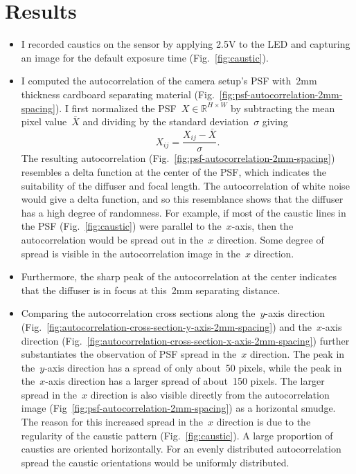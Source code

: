 \documentclass[final]{cvpr}
\begin{document}
\section{Results}

\begin{itemize}
	\item I recorded caustics on the sensor by applying 2.5V to the LED and capturing an image for the default exposure time (Fig.~\ref{fig:caustic}).

	\item I computed the autocorrelation of the camera setup's PSF
	      with~\num{2}mm thickness cardboard separating material
	      (Fig.~\ref{fig:psf-autocorrelation-2mm-spacing}).
	      I first normalized the PSF~$X\in\mathbb{R}^{H\times W}$ by
	      subtracting the mean pixel value~$\overline{X}$ and dividing by the standard
	      deviation~$\sigma$ giving
	      \begin{equation}
		      X_{ij} = \frac{X_{ij} - \overline{X}}{\sigma}.
	      \end{equation}
	      The resulting autocorrelation
	      (Fig.~\ref{fig:psf-autocorrelation-2mm-spacing}) resembles a
	      delta function at the center of the PSF, which indicates the
	      suitability of the diffuser and focal length.
	      The autocorrelation of white noise would give a delta function,
	      and so this resemblance shows that the diffuser has a high degree
	      of randomness.
	      For example, if most of the caustic lines in the PSF
	      (Fig.~\ref{fig:caustic}) were parallel to the~$x$-axis, then the
	      autocorrelation would be spread out in the~$x$ direction.
	      Some degree of spread is visible in the autocorrelation image in
	      the~$x$ direction.

	\item Furthermore, the sharp peak of the autocorrelation at the center
	      indicates that the diffuser is in focus at this~\num{2}mm
	      separating distance.

	\item Comparing the autocorrelation cross sections along the~$y$-axis
	      direction
	      (Fig.~\ref{fig:autocorrelation-cross-section-y-axis-2mm-spacing})
	      and the~$x$-axis direction
	      (Fig.~\ref{fig:autocorrelation-cross-section-x-axis-2mm-spacing})
	      further substantiates the observation of PSF spread in the~$x$
	      direction.
	      The peak in the~$y$-axis direction has a spread of only
	      about~\num{50} pixels, while the peak in the~$x$-axis direction
	      has a larger spread of about~\num{150} pixels.
	      The larger spread in the~$x$ direction is also visible directly
	      from the autocorrelation image
	      (Fig~\ref{fig:psf-autocorrelation-2mm-spacing}) as a horizontal
	      smudge.
	      The reason for this increased spread in the~$x$ direction is due
	      to the regularity of the caustic pattern
	      (Fig.~\ref{fig:caustic}).
	      A large proportion of caustics are oriented horizontally.
	      For an evenly distributed autocorrelation spread the caustic
	      orientations would be uniformly distributed.


\end{itemize}
\end{document}
